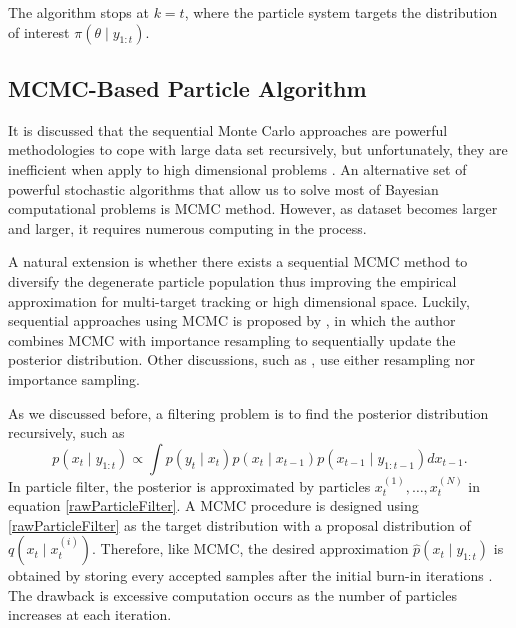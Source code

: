 The algorithm stops at $k=t$, where the particle system targets the distribution of interest $\pi(\theta\mid y_{1:t})$. 


\subsection{MCMC-Based Particle Algorithm}

It is discussed that the sequential Monte Carlo approaches are powerful methodologies to cope with large data set recursively, but unfortunately, they are inefficient when apply to high dimensional problems \citep{septier2009mcmc}.  An alternative set of powerful stochastic algorithms that allow us to solve most of Bayesian computational problems is MCMC method. However, as dataset becomes larger and larger, it requires numerous computing in the process. 

A natural extension is whether there exists a sequential MCMC method to diversify the degenerate particle population thus improving the empirical approximation for multi-target tracking or high dimensional space. Luckily, sequential approaches using MCMC is proposed by \cite{berzuini1997dynamic}, in which the author combines MCMC with importance resampling to sequentially update the posterior distribution. 
Other discussions, such as \citep{khan2005mcmc, golightly2006bayesian, pang2008models}, use either resampling nor importance sampling. 

As we discussed before, a filtering problem is to find the posterior distribution recursively, such as  
\begin{equation}
p(x_t\mid y_{1:t}) \propto \int p(y_t\mid x_t)p(x_t\mid x_{t-1})p(x_{t-1}\mid y_{1:t-1})dx_{t-1}. 
\end{equation} 
In particle filter, the posterior is approximated by particles $x_t^{(1)},\ldots,x_t^{(N)}$ in equation \eqref{rawParticleFilter}. A MCMC procedure is designed using \eqref{rawParticleFilter} as the target distribution with a proposal distribution of $q\left(x_t\mid x_t^{(i)}\right)$. Therefore, like MCMC, the desired approximation $\hat{p}(x_t\mid y_{1:t})$ is obtained by storing every accepted samples after the initial burn-in iterations \citep{septier2009mcmc}. The drawback is excessive computation occurs as the number of particles increases at each iteration. 

